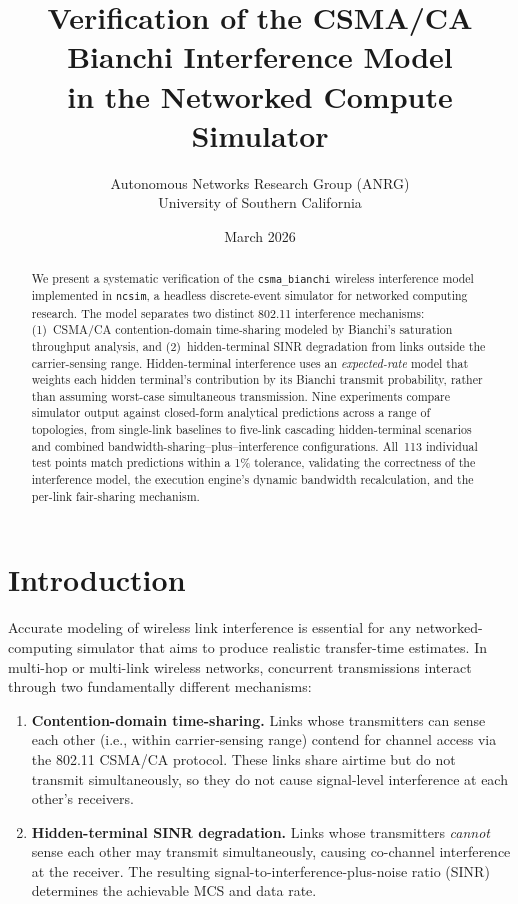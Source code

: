 \documentclass[11pt,a4paper]{article}
\title{Verification of the CSMA/CA Bianchi Interference Model\\in the \ncsim{} Networked Compute Simulator}
\author{Autonomous Networks Research Group (ANRG)\\University of Southern California}
\date{March 2026}
\newcommand{\ncsim}{\texttt{ncsim}}
\begin{document}
\maketitle

\begin{abstract}
We present a systematic verification of the \texttt{csma\_bianchi} wireless interference model implemented in \ncsim{}, a headless discrete-event simulator for networked computing research. The model separates two distinct 802.11 interference mechanisms: (1)~CSMA/CA contention-domain time-sharing modeled by Bianchi's saturation throughput analysis, and (2)~hidden-terminal SINR degradation from links outside the carrier-sensing range. Hidden-terminal interference uses an \emph{expected-rate} model that weights each hidden terminal's contribution by its Bianchi transmit probability, rather than assuming worst-case simultaneous transmission. Nine experiments compare simulator output against closed-form analytical predictions across a range of topologies, from single-link baselines to five-link cascading hidden-terminal scenarios and combined bandwidth-sharing--plus--interference configurations. All~113 individual test points match predictions within a 1\% tolerance, validating the correctness of the interference model, the execution engine's dynamic bandwidth recalculation, and the per-link fair-sharing mechanism.
\end{abstract}

\section{Introduction}
\label{sec:intro}

Accurate modeling of wireless link interference is essential for any networked-computing simulator that aims to produce realistic transfer-time estimates. In multi-hop or multi-link wireless networks, concurrent transmissions interact through two fundamentally different mechanisms:

\begin{enumerate}    \item \textbf{Contention-domain time-sharing.} Links whose transmitters can sense each other (i.e., within carrier-sensing range) contend for channel access via the 802.11 CSMA/CA protocol. These links share airtime but do not transmit simultaneously, so they do not cause signal-level interference at each other's receivers.
    \item \textbf{Hidden-terminal SINR degradation.} Links whose transmitters \emph{cannot} sense each other may transmit simultaneously, causing co-channel interference at the receiver. The resulting signal-to-interference-plus-noise ratio (SINR) determines the achievable MCS and data rate.
\end{enumerate}
\end{document}
